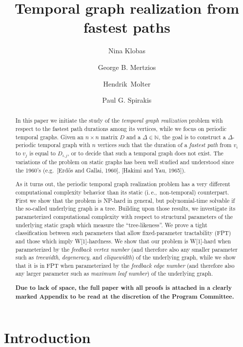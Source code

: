 \documentclass[a4paper,UKenglish,cleveref, autoref, thm-restate, anonymous]{lipics-v2021}
\title{Temporal graph realization from fastest paths} %
\author{Nina Klobas}{Department of Computer Science, Durham University, UK}{nina.klobas@durham.ac.uk}{ https://orcid.org/0000-0002-8024-5782}{}
\author{George B. Mertzios}{Department of Computer Science, Durham University, UK}{george.mertzios@durham.ac.uk}{https://orcid.org/0000-0001-7182-585X}{Supported by the EPSRC grant EP/P020372/1.}
\author{Hendrik~Molter}{Department of Computer Science, Ben-Gurion~University~of~the~Negev, Beer-Sheva, Israel}{molterh@post.bgu.ac.il}{https://orcid.org/0000-0002-4590-798X}{Supported by the ISF, grant No.~1456/18, and the ERC, grant number 949707.}
\author{Paul G. Spirakis}{Department of Computer Science, University of Liverpool, UK}{p.spirakis@liverpool.ac.uk}{https://orcid.org/0000-0001-5396-3749}{Supported by the EPSRC grant EP/P02002X/1.}
\newcommand{\ie}{i.\,e.,\ }
\begin{document}
\maketitle

\begin{abstract}
In this paper we initiate the study of the \emph{temporal graph realization} problem with respect to the fastest path durations among its vertices, 
while we focus on periodic temporal graphs. 
Given an $n \times n$ matrix $D$ and a $\Delta \in \mathbb{N}$, the goal is to construct a $\Delta$-periodic temporal graph with $n$ vertices 
such that the duration of a \emph{fastest path} from $v_i$ to $v_j$ is equal to $D_{i,j}$, or to decide that such a temporal graph does not exist. 
The variations of the problem on static graphs has been well studied and understood since the 1960's (e.g.\ [Erd\H{o}s and Gallai, 1960], [Hakimi and Yau, 1965]).

As it turns out, the periodic temporal graph realization problem has a very different computational complexity behavior than its static (\ie non-temporal) counterpart. 
First we show that the problem is NP-hard in general, but polynomial-time solvable if the so-called underlying graph is a tree.
Building upon those results, we investigate its parameterized computational complexity with respect to structural parameters of the underlying static graph which measure the ``tree-likeness''. We prove a tight classification between such parameters that allow fixed-parameter tractability (FPT) 
and those which imply W[1]-hardness. 
We show that our problem is W[1]-hard when parameterized by the \emph{feedback vertex number} (and therefore also any smaller parameter such as \emph{treewidth}, \emph{degeneracy}, and \emph{cliquewidth}) of the underlying graph, while we show that it is in FPT when parameterized by the \emph{feedback edge number} (and therefore also any larger parameter such as \emph{maximum leaf number}) of the underlying graph. 





\vspace{0,2cm}
\noindent \textbf{Due to lack of space, the full paper with all proofs is attached in a 
	clearly marked Appendix to be read at the discretion of the Program Committee.}
\end{abstract}


\section{Introduction}\label{intro-sec}
\end{document}
